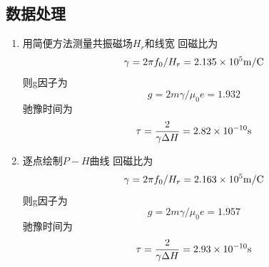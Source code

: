\documentclass[a4paper]{article}
\begin{document}
\subsection{数据处理}\label{sub3}
\begin{enumerate}[1)]
\item 用简便方法测量共振磁场$H_r$和线宽
回磁比为
\begin{equation}
    \gamma=2\pi f_0/H_r=2.135\times10^5\rm m/C
\end{equation}
则g因子为
\begin{equation}
    g=2m\gamma/\mu_0 e=1.932
\end{equation}
驰豫时间为
\begin{equation}
    \tau=\frac{2}{\gamma\Delta H}=2.82\times10^{-10}\rm s
\end{equation}
\item 逐点绘制$P-H$曲线
回磁比为
\begin{equation}
    \gamma=2\pi f_0/H_r=2.163\times10^5\rm m/C
\end{equation}
则g因子为
\begin{equation}
    g=2m\gamma/\mu_0 e=1.957
\end{equation}
驰豫时间为
\begin{equation}
    \tau=\frac{2}{\gamma\Delta H}=2.93\times10^{-10}\rm s
\end{equation}
\end{enumerate}
\newpage
\end{document}
